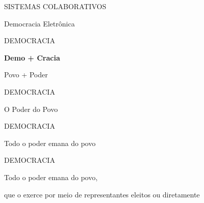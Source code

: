\documentclass{Alexandre}
\begin{document}
\begin{frame}{SISTEMAS COLABORATIVOS}
    
    \begin{center}
        \Large  Democracia Eletrônica
    \end{center}
    
\end{frame}


\begin{frame}{DEMOCRACIA}
    \begin{center}
        \Large \textbf{Demo + Cracia}
        
        \Large Povo + Poder
    \end{center}

\end{frame}


\begin{frame}{DEMOCRACIA}

    \begin{center}
        \Large O Poder do Povo
    \end{center}

\end{frame}


\begin{frame}{DEMOCRACIA}

    \begin{center}
        \Large Todo o poder emana do povo
    \end{center}

\end{frame}


\begin{frame}{DEMOCRACIA}

    \begin{center}
        \Large Todo o poder emana do povo,
        
        \vspace{2cm}
        
        \Large que o exerce por meio de representantes eleitos ou diretamente
    \end{center}

\end{frame}
\end{document}
